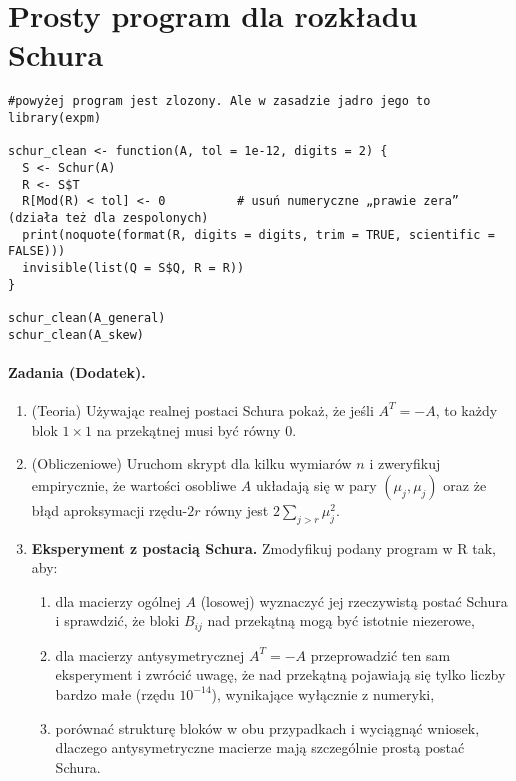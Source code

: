 \documentclass[12pt]{article}
\theoremstyle{plain}
\theoremstyle{remark}
\begin{document}
\section{Prosty program dla rozkładu Schura}
\begin{verbatim}
#powyżej program jest zlozony. Ale w zasadzie jadro jego to
library(expm)

schur_clean <- function(A, tol = 1e-12, digits = 2) {
  S <- Schur(A)
  R <- S$T
  R[Mod(R) < tol] <- 0          # usuń numeryczne „prawie zera” (działa też dla zespolonych)
  print(noquote(format(R, digits = digits, trim = TRUE, scientific = FALSE)))
  invisible(list(Q = S$Q, R = R))
}

schur_clean(A_general)
schur_clean(A_skew)
\end{verbatim}

\paragraph{Zadania (Dodatek).}
\begin{enumerate}[itemsep=3pt]
  \item (Teoria) Używając realnej postaci Schura pokaż, że jeśli $A^T=-A$, 
        to każdy blok $1\times1$ na przekątnej musi być równy $0$.
  \item (Obliczeniowe) Uruchom skrypt dla kilku wymiarów $n$ i zweryfikuj empirycznie,
        że wartości osobliwe $A$ układają się w pary $(\mu_j,\mu_j)$ oraz że
        błąd aproksymacji rzędu-$2r$ równy jest $2\sum_{j>r}\mu_j^2$.

\item \textbf{Eksperyment z postacią Schura.} 
Zmodyfikuj podany program w R tak, aby:
\begin{enumerate}[label=(\alph*),itemsep=2pt]
  \item dla macierzy ogólnej $A$ (losowej) wyznaczyć jej rzeczywistą postać Schura i sprawdzić, że bloki $B_{ij}$ nad przekątną mogą być istotnie niezerowe,
  \item dla macierzy antysymetrycznej $A^T=-A$ przeprowadzić ten sam eksperyment i zwrócić uwagę, że nad przekątną pojawiają się tylko liczby bardzo małe (rzędu $10^{-14}$), wynikające wyłącznie z numeryki,
  \item porównać strukturę bloków w obu przypadkach i wyciągnąć wniosek, dlaczego antysymetryczne macierze mają szczególnie prostą postać Schura.
\end{enumerate}
\end{enumerate}
\end{document}

